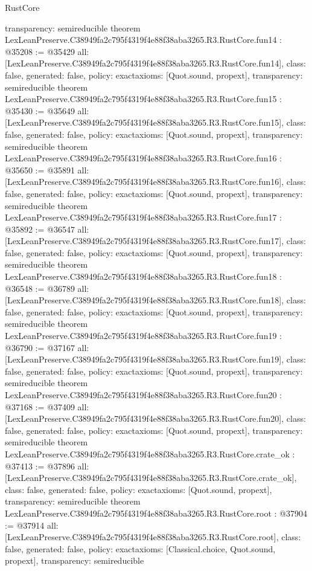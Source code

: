 \begin{lexlean}{RustCore}
\begin{coremodule}
{  transparency: semireducible
}
theorem LexLeanPreserve.C38949fa2c795f4319f4e88f38aba3265.R3.RustCore.fun14 : @35208 := @35429 {
  all: [LexLeanPreserve.C38949fa2c795f4319f4e88f38aba3265.R3.RustCore.fun14],
  class: false,
  generated: false,
  policy: exact{axioms: [Quot.sound, propext]},
  transparency: semireducible
}
theorem LexLeanPreserve.C38949fa2c795f4319f4e88f38aba3265.R3.RustCore.fun15 : @35430 := @35649 {
  all: [LexLeanPreserve.C38949fa2c795f4319f4e88f38aba3265.R3.RustCore.fun15],
  class: false,
  generated: false,
  policy: exact{axioms: [Quot.sound, propext]},
  transparency: semireducible
}
theorem LexLeanPreserve.C38949fa2c795f4319f4e88f38aba3265.R3.RustCore.fun16 : @35650 := @35891 {
  all: [LexLeanPreserve.C38949fa2c795f4319f4e88f38aba3265.R3.RustCore.fun16],
  class: false,
  generated: false,
  policy: exact{axioms: [Quot.sound, propext]},
  transparency: semireducible
}
theorem LexLeanPreserve.C38949fa2c795f4319f4e88f38aba3265.R3.RustCore.fun17 : @35892 := @36547 {
  all: [LexLeanPreserve.C38949fa2c795f4319f4e88f38aba3265.R3.RustCore.fun17],
  class: false,
  generated: false,
  policy: exact{axioms: [Quot.sound, propext]},
  transparency: semireducible
}
theorem LexLeanPreserve.C38949fa2c795f4319f4e88f38aba3265.R3.RustCore.fun18 : @36548 := @36789 {
  all: [LexLeanPreserve.C38949fa2c795f4319f4e88f38aba3265.R3.RustCore.fun18],
  class: false,
  generated: false,
  policy: exact{axioms: [Quot.sound, propext]},
  transparency: semireducible
}
theorem LexLeanPreserve.C38949fa2c795f4319f4e88f38aba3265.R3.RustCore.fun19 : @36790 := @37167 {
  all: [LexLeanPreserve.C38949fa2c795f4319f4e88f38aba3265.R3.RustCore.fun19],
  class: false,
  generated: false,
  policy: exact{axioms: [Quot.sound, propext]},
  transparency: semireducible
}
theorem LexLeanPreserve.C38949fa2c795f4319f4e88f38aba3265.R3.RustCore.fun20 : @37168 := @37409 {
  all: [LexLeanPreserve.C38949fa2c795f4319f4e88f38aba3265.R3.RustCore.fun20],
  class: false,
  generated: false,
  policy: exact{axioms: [Quot.sound, propext]},
  transparency: semireducible
}
theorem LexLeanPreserve.C38949fa2c795f4319f4e88f38aba3265.R3.RustCore.crate_ok : @37413 := @37896 {
  all: [LexLeanPreserve.C38949fa2c795f4319f4e88f38aba3265.R3.RustCore.crate_ok],
  class: false,
  generated: false,
  policy: exact{axioms: [Quot.sound, propext]},
  transparency: semireducible
}
theorem LexLeanPreserve.C38949fa2c795f4319f4e88f38aba3265.R3.RustCore.root : @37904 := @37914 {
  all: [LexLeanPreserve.C38949fa2c795f4319f4e88f38aba3265.R3.RustCore.root],
  class: false,
  generated: false,
  policy: exact{axioms: [Classical.choice, Quot.sound, propext]},
  transparency: semireducible
}


\end{coremodule}
\end{lexlean}
